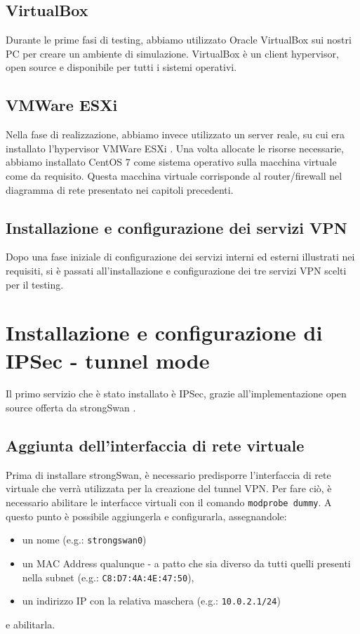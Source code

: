 \subsection{VirtualBox}
Durante le prime fasi di testing, abbiamo utilizzato Oracle VirtualBox \cite{virtualbox} sui nostri PC per creare un ambiente di simulazione. VirtualBox è un client hypervisor, open source e disponibile per tutti i sistemi operativi.
\subsection{VMWare ESXi}
Nella fase di realizzazione, abbiamo invece utilizzato un server reale, su cui era installato l'hypervisor VMWare ESXi \cite{esxi}. Una volta allocate le risorse necessarie, abbiamo installato CentOS 7 come sistema operativo sulla macchina virtuale come da requisito.
Questa macchina virtuale corrisponde al router/firewall nel diagramma di rete presentato nei capitoli precedenti.

\subsection{Installazione e configurazione dei servizi VPN}
Dopo una fase iniziale di configurazione dei servizi interni ed esterni illustrati nei requisiti, si è passati all'installazione e configurazione dei tre servizi VPN scelti per il testing.

\section{Installazione e configurazione di IPSec - tunnel mode}
Il primo servizio che è stato installato è IPSec, grazie all'implementazione open source offerta da strongSwan \cite{strongSwan}.


\subsection{Aggiunta dell'interfaccia di rete virtuale}
Prima di installare strongSwan, è necessario predisporre l'interfaccia di rete virtuale che verrà utilizzata per la creazione del tunnel VPN. Per fare ciò, è necessario abilitare le interfacce virtuali con il comando \texttt{modprobe dummy}.
A questo punto è possibile aggiungerla e configurarla, assegnandole:
\begin{itemize}
    \item un nome (e.g.: \texttt{strongswan0})
    \item un MAC Address qualunque - a patto che sia diverso da tutti quelli presenti nella subnet (e.g.: \texttt{C8:D7:4A:4E:47:50}),
    \item un indirizzo IP con la relativa maschera (e.g.: \texttt{10.0.2.1/24})
\end{itemize}
e abilitarla.

